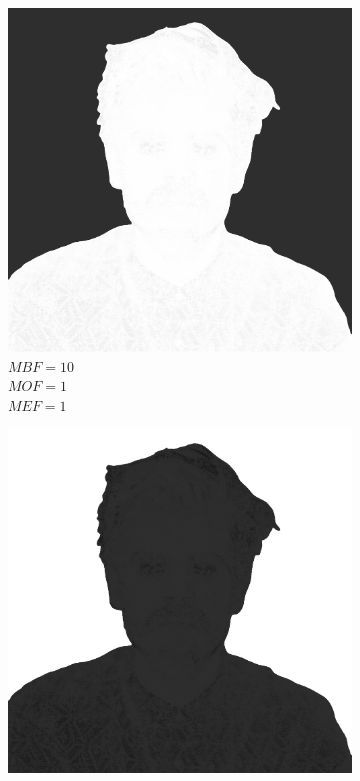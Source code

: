 \begin{figure}[H]
\begin{subfigure}{0.32\textwidth}
        \includegraphics[width = \textwidth]{img/4-mine/taco-mask/taco_mask_c20_inv0_bg10_obj1_ed1.png}
        \caption{\(MBF = 10\) \\ \(MOF = 1\) \\ \(MEF = 1\)}
        \label{mine-param-taco-d}
    \end{subfigure}
    \begin{subfigure}{0.32\textwidth}
        \centering
        \includegraphics[width = \textwidth]{img/4-mine/taco-mask/taco_mask_c20_inv0_bg1_obj10_ed1.png}

\end{subfigure}
\end{figure}
